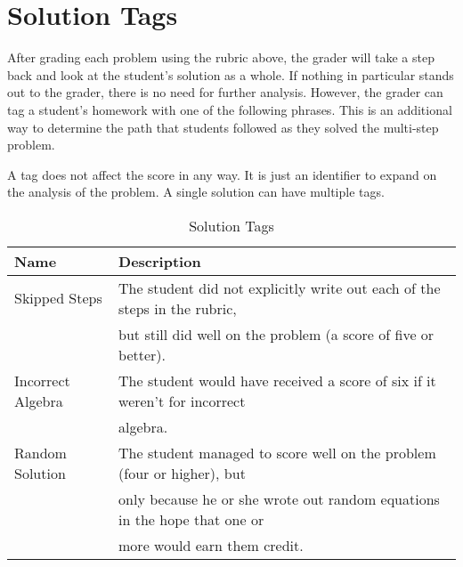 \section{Solution Tags}

After grading each problem using the rubric above, the grader will take a step back and look at the student's solution as a whole. If nothing in particular stands out to the grader, there is no need for further analysis. However, the grader can tag a student's homework with one of the following phrases. This is an additional way to determine the path that students followed as they solved the multi-step problem.

A tag does not affect the score in any way. It is just an identifier to expand on the analysis of the problem. A single solution can have multiple tags.

\pagebreak

\begin{landscape}
\begin{table}[!ht]
  \centering
  \begin{tabular}{|l|l|}
    \hline
    \textbf{Name} & \textbf{Description}\\
	\hline
	Skipped Steps & The student did not explicitly write out each of the steps in the rubric,\\
	& but still did well on the problem (a score of five or better).\\
	\hline
	Incorrect Algebra & The student would have received a score of six if it weren't for incorrect\\
	& algebra.\\
	\hline
	Random Solution & The student managed to score well on the problem (four or higher), but\\
	& only because he or she wrote out random equations in the hope that one or\\
	& more would earn them credit.\\
	\hline
  \end{tabular}
  \caption{Solution Tags}
  \label{tab:solution-tags}
\end{table}
\end{landscape}



